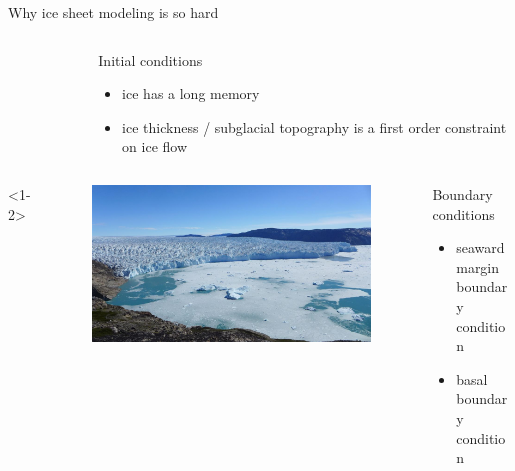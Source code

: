 \documentclass[hide notes,intlimits]{beamer}
\begin{document}
\begin{frame}{Why ice sheet modeling is so hard}
\begin{columns}[c]
\begin{column}{.28\linewidth}
\begin{figure}
        \end{figure}
      \end{column}
      \begin{column}{.67\linewidth}
        \begin{block}{Initial conditions}
        \begin{itemize}
        \item ice has a long memory
        \item ice thickness / subglacial topography is a first order constraint on ice flow
        \end{itemize}
      \end{block}
      \end{column}
    \end{columns}
    \begin{columns}[c]<1-2>
      \begin{column}{.28\linewidth}
        \begin{figure}
          \includegraphics[width=\linewidth]{storeglacier}
        \end{figure}
      \end{column}
      \begin{column}{.67\linewidth}
        \begin{block}{Boundary conditions}
        \begin{itemize}
        \item seaward margin boundary condition
        \item basal boundary condition
        \end{itemize}
      \end{block}
      \end{column}
    \end{columns}
\end{frame}
\end{document}
